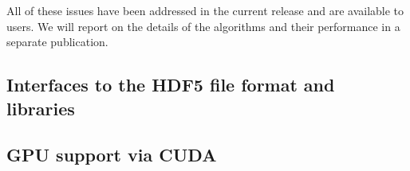 \documentclass{ansarticle-preprint}
\begin{document}
All of these issues have been addressed in the current release and are
available to users. We will report on the details of the algorithms
and their performance in a separate publication.


\subsection{Interfaces to the HDF5 file format and libraries}
\label{subsec:hdf5}


\subsection{GPU support via CUDA}
\label{subsec:gpu}
\end{document}
